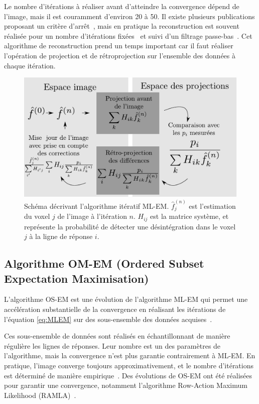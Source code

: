 Le nombre d'itérations à réaliser avant d'atteindre la convergence dépend de l'image, mais il est couramment d'environ 20 à 50. Il existe plusieurs publications proposant un critère d'arrêt~\cite{bissantz2006multi}, mais en pratique la reconstruction est souvent réalisée pour un nombre d'itérations fixées~\cite{bailey2005positron} et  suivi d'un filtrage passe-bas~\cite{daube2001application}. Cet algorithme de reconstruction prend un temps important car il faut réaliser l'opération de projection et de rétroprojection sur l'ensemble des données à chaque itération.

\begin{figure}
\centering
\includegraphics[width=12cm]{images/MLEM}
\caption[Schéma de principe de l'algorithme MLEM]{Schéma décrivant l'algorithme itératif ML-EM. $\hat{f}^{(n)}_j$ est l'estimation du voxel $j$ de l'image à l'itération $n$. $H_{ij}$ est la matrice système, et représente la probabilité de détecter une désintégration dans le voxel $j$ à la ligne de réponse $i$.}
\label{fig:schemaMLEM}
\end{figure}


	\subsection{Algorithme OM-EM (Ordered Subset Expectation Maximisation)}

L'algorithme OS-EM est une évolution de l'algorithme ML-EM  qui permet une accélération substantielle de la convergence en réalisant les itérations de l'équation \ref{eq:MLEM} sur des sous-ensemble des données acquises~\cite{hudson1994accelerated}. 

Ces sous-ensemble de données sont réalisés en échantillonnant de manière régulière les lignes de réponses. Leur nombre est un des paramètres de l'algorithme, mais la convergence n'est plus garantie contrairement à ML-EM. En pratique, l'image converge toujours approximativement, et le nombre d'itérations est déterminé de manière empirique~\cite{bailey2005positon}. Des évolutions de OS-EM ont été réalisées pour garantir une convergence, notamment l'algorithme Row-Action Maximum Likelihood (RAMLA)~\cite{browne1996row, chiang2004clinical}.


